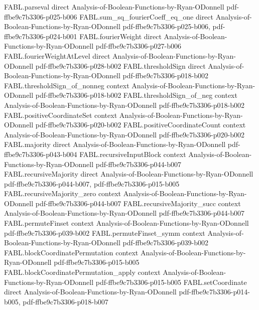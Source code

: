 \begin{theorem}
\proofstep
  {FABL.parseval}
  {direct}
  {Analysis-of-Boolean-Functions-by-Ryan-ODonnell}
  {pdf-ffbe9c7b3306-p025-b006}
\proofstep
  {FABL.sum_sq_fourierCoeff_eq_one}
  {direct}
  {Analysis-of-Boolean-Functions-by-Ryan-ODonnell}
  {pdf-ffbe9c7b3306-p025-b006,
    pdf-ffbe9c7b3306-p024-b001}
\proofstep
  {FABL.fourierWeight}
  {direct}
  {Analysis-of-Boolean-Functions-by-Ryan-ODonnell}
  {pdf-ffbe9c7b3306-p027-b006}
\proofstep
  {FABL.fourierWeightAtLevel}
  {direct}
  {Analysis-of-Boolean-Functions-by-Ryan-ODonnell}
  {pdf-ffbe9c7b3306-p028-b002}
\proofstep
  {FABL.thresholdSign}
  {direct}
  {Analysis-of-Boolean-Functions-by-Ryan-ODonnell}
  {pdf-ffbe9c7b3306-p018-b002}
\proofstep
  {FABL.thresholdSign_of_nonneg}
  {context}
  {Analysis-of-Boolean-Functions-by-Ryan-ODonnell}
  {pdf-ffbe9c7b3306-p018-b002}
\proofstep
  {FABL.thresholdSign_of_neg}
  {context}
  {Analysis-of-Boolean-Functions-by-Ryan-ODonnell}
  {pdf-ffbe9c7b3306-p018-b002}
\proofstep
  {FABL.positiveCoordinateSet}
  {context}
  {Analysis-of-Boolean-Functions-by-Ryan-ODonnell}
  {pdf-ffbe9c7b3306-p020-b002}
\proofstep
  {FABL.positiveCoordinateCount}
  {context}
  {Analysis-of-Boolean-Functions-by-Ryan-ODonnell}
  {pdf-ffbe9c7b3306-p020-b002}
\proofstep
  {FABL.majority}
  {direct}
  {Analysis-of-Boolean-Functions-by-Ryan-ODonnell}
  {pdf-ffbe9c7b3306-p043-b004}
\proofstep
  {FABL.recursiveInputBlock}
  {context}
  {Analysis-of-Boolean-Functions-by-Ryan-ODonnell}
  {pdf-ffbe9c7b3306-p044-b007}
\proofstep
  {FABL.recursiveMajority}
  {direct}
  {Analysis-of-Boolean-Functions-by-Ryan-ODonnell}
  {pdf-ffbe9c7b3306-p044-b007,
    pdf-ffbe9c7b3306-p015-b005}
\proofstep
  {FABL.recursiveMajority_zero}
  {context}
  {Analysis-of-Boolean-Functions-by-Ryan-ODonnell}
  {pdf-ffbe9c7b3306-p044-b007}
\proofstep
  {FABL.recursiveMajority_succ}
  {context}
  {Analysis-of-Boolean-Functions-by-Ryan-ODonnell}
  {pdf-ffbe9c7b3306-p044-b007}
\proofstep
  {FABL.permuteFinset}
  {context}
  {Analysis-of-Boolean-Functions-by-Ryan-ODonnell}
  {pdf-ffbe9c7b3306-p039-b002}
\proofstep
  {FABL.permuteFinset_symm}
  {context}
  {Analysis-of-Boolean-Functions-by-Ryan-ODonnell}
  {pdf-ffbe9c7b3306-p039-b002}
\proofstep
  {FABL.blockCoordinatePermutation}
  {context}
  {Analysis-of-Boolean-Functions-by-Ryan-ODonnell}
  {pdf-ffbe9c7b3306-p015-b005}
\proofstep
  {FABL.blockCoordinatePermutation_apply}
  {context}
  {Analysis-of-Boolean-Functions-by-Ryan-ODonnell}
  {pdf-ffbe9c7b3306-p015-b005}
\proofstep
  {FABL.setCoordinate}
  {direct}
  {Analysis-of-Boolean-Functions-by-Ryan-ODonnell}
  {pdf-ffbe9c7b3306-p014-b005,
    pdf-ffbe9c7b3306-p018-b007}

\end{theorem}
